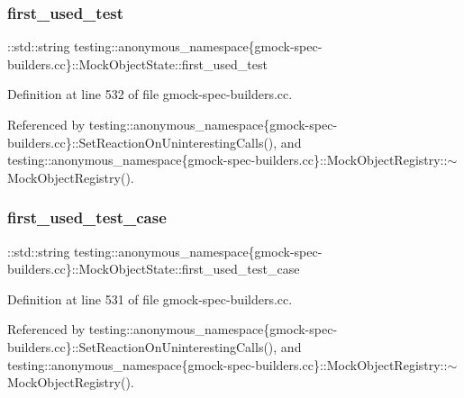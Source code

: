 \subsubsection{\texorpdfstring{first\+\_\+used\+\_\+test}{first\_used\_test}}
{\footnotesize\ttfamily \+::std\+::string testing\+::anonymous\+\_\+namespace\{gmock-\/spec-\/builders.\+cc\}\+::Mock\+Object\+State\+::first\+\_\+used\+\_\+test}



Definition at line 532 of file gmock-\/spec-\/builders.\+cc.



Referenced by testing\+::anonymous\+\_\+namespace\{gmock-\/spec-\/builders.\+cc\}\+::\+Set\+Reaction\+On\+Uninteresting\+Calls(), and testing\+::anonymous\+\_\+namespace\{gmock-\/spec-\/builders.\+cc\}\+::\+Mock\+Object\+Registry\+::$\sim$\+Mock\+Object\+Registry().

\mbox{\label{structtesting_1_1anonymous__namespace_02gmock-spec-builders_8cc_03_1_1MockObjectState_a4446fa6230645010c4bfe2b3a22330cf}} 
\subsubsection{\texorpdfstring{first\+\_\+used\+\_\+test\+\_\+case}{first\_used\_test\_case}}
{\footnotesize\ttfamily \+::std\+::string testing\+::anonymous\+\_\+namespace\{gmock-\/spec-\/builders.\+cc\}\+::Mock\+Object\+State\+::first\+\_\+used\+\_\+test\+\_\+case}



Definition at line 531 of file gmock-\/spec-\/builders.\+cc.



Referenced by testing\+::anonymous\+\_\+namespace\{gmock-\/spec-\/builders.\+cc\}\+::\+Set\+Reaction\+On\+Uninteresting\+Calls(), and testing\+::anonymous\+\_\+namespace\{gmock-\/spec-\/builders.\+cc\}\+::\+Mock\+Object\+Registry\+::$\sim$\+Mock\+Object\+Registry().

